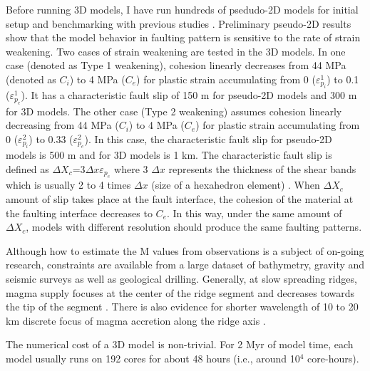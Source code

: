 Before running 3D models, I have run hundreds of psedudo-2D models for initial setup and benchmarking with previous studies \citep[e.g.,][]{Buck2005, Tucholke2008}. Preliminary pseudo-2D results show that the model behavior in faulting pattern is sensitive to the rate of strain weakening. Two cases of strain weakening are tested in the 3D models. In one case (denoted as Type 1 weakening), cohesion linearly decreases from 44 MPa (denoted as $C_{i}$) to 4 MPa ($C_{e}$) for plastic strain accumulating from 0 ($\varepsilon_{p_{i}}^{1}$) to 0.1 ($\varepsilon_{p_{e}}^{1}$). It has a characteristic fault slip of 150 m for pseudo-2D models and 300 m for 3D models. The other case (Type 2 weakening) assumes cohesion linearly decreasing from 44 MPa ($C_{i}$) to 4 MPa ($C_{e}$) for plastic strain accumulating from 0 ($\varepsilon_{p_{i}}^{2}$) to 0.33 ($\varepsilon_{p_{e}}^{2}$). In this case, the characteristic fault slip for pseudo-2D models is 500 m and for 3D models is 1 km. The characteristic fault slip is defined as $\Delta X_{c}$=3$\Delta x \varepsilon_{p_{e}}$ where 3 $\Delta x$ represents the thickness of the shear bands which is usually 2 to 4 times $\Delta x$ (size of a hexahedron element) \citep{Lavier2000}. When $\Delta X_{c}$ amount of slip takes place at the fault interface, the cohesion of the material at the faulting interface decreases to $C_{e}$. In this way, under the same amount of $\Delta X_{c}$, models with different resolution should produce the same faulting patterns. 

Although how to estimate the M values from observations is a subject of on-going research, constraints are available from a large dataset of bathymetry, gravity and seismic surveys as well as geological drilling. Generally, at slow spreading ridges, magma supply focuses at the center of the ridge segment and decreases towards the tip of the segment \citep[e.g.,][]{Tolstoy1993,Chen1999,Carbotte2015}. There is also evidence for shorter wavelength of 10 to 20 km discrete focus of magma accretion along the ridge axis \citep{Lin1990}.

The numerical cost of a 3D model is non-trivial. For 2 Myr of model time, each model usually runs on 192 cores for about 48 hours (i.e., around 10$^{4}$ core-hours). %

